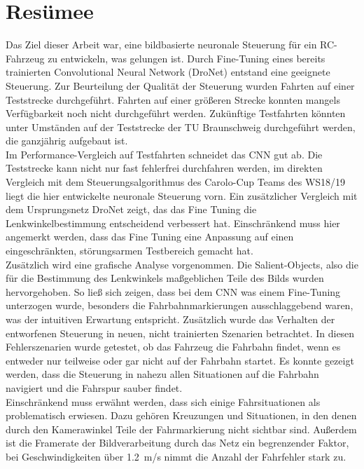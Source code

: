 %
\chapter{Resümee}

Das Ziel dieser Arbeit war, eine bildbasierte neuronale Steuerung für ein RC-Fahrzeug zu entwickeln, was gelungen ist. Durch Fine-Tuning eines bereits trainierten Convolutional Neural Network (DroNet) entstand eine geeignete Steuerung. Zur Beurteilung der Qualität der Steuerung wurden Fahrten auf einer Teststrecke durchgeführt. Fahrten auf einer größeren Strecke konnten mangels Verfügbarkeit noch nicht durchgeführt werden. Zukünftige Testfahrten könnten unter Umständen auf der Teststrecke der TU Braunschweig durchgeführt werden, die ganzjährig aufgebaut ist.\\
Im Performance-Vergleich auf Testfahrten schneidet das CNN gut ab. Die Teststrecke kann nicht nur fast fehlerfrei durchfahren werden, im direkten Vergleich mit dem Steuerungsalgorithmus des Carolo-Cup Teams des WS18/19 liegt die hier entwickelte neuronale Steuerung vorn. Ein zusätzlicher Vergleich mit dem Ursprungsnetz DroNet zeigt, das das Fine Tuning die Lenkwinkelbestimmung entscheidend verbessert hat. Einschränkend muss hier angemerkt werden, dass das Fine Tuning eine Anpassung auf einen eingeschränkten, störungsarmen Testbereich gemacht hat.\\
Zusätzlich wird eine grafische Analyse vorgenommen. Die Salient-Objects, also die für die Bestimmung des Lenkwinkels maßgeblichen Teile des Bilds wurden hervorgehoben. So ließ sich zeigen, dass bei dem CNN was einem Fine-Tuning unterzogen wurde, besonders die Fahrbahnmarkierungen ausschlaggebend waren, was der intuitiven Erwartung entspricht. Zusätzlich wurde das Verhalten der entworfenen Steuerung in neuen, nicht trainierten Szenarien betrachtet. In diesen Fehlerszenarien wurde getestet, ob das Fahrzeug die Fahrbahn findet, wenn es entweder nur teilweise oder gar nicht auf der Fahrbahn startet. Es konnte gezeigt werden, dass die Steuerung in nahezu allen Situationen auf die Fahrbahn navigiert und die Fahrspur sauber findet.\\
Einschränkend muss erwähnt werden, dass sich einige Fahrsituationen als problematisch erwiesen. Dazu gehören Kreuzungen und Situationen, in den denen durch den Kamerawinkel Teile der Fahrmarkierung nicht sichtbar sind. Außerdem ist die Framerate der Bildverarbeitung durch das Netz ein begrenzender Faktor, bei Geschwindigkeiten über \SI{1.2}{\meter/\second} nimmt die Anzahl der Fahrfehler stark zu.\\
